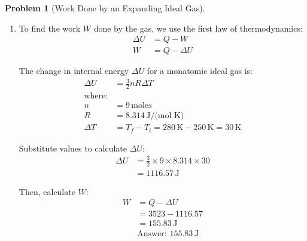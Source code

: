 \documentclass[12pt]{article}
\theoremstyle{definition} %
\newtheorem{problem}{Problem}
\theoremstyle{plain} %
\begin{document}
\begin{problem}[Work Done by an Expanding Ideal Gas]
    \noindent
    \begin{enumerate}
        \item 
        To find the work \( W \) done by the gas, we use the first law of thermodynamics:
        \begin{align*}
        \Delta U &= Q - W \\
        W &= Q - \Delta U
        \end{align*}
        
        The change in internal energy \( \Delta U \) for a monatomic ideal gas is:
        \begin{align*}
        \Delta U &= \frac{3}{2} n R \Delta T \\
        \text{where:} \\
        n &= 9 \, \text{moles} \\
        R &= 8.314 \, \text{J/(mol K)} \\
        \Delta T &= T_f - T_i = 280 \, \text{K} - 250 \, \text{K} = 30 \, \text{K}
        \end{align*}

        Substitute values to calculate \( \Delta U \):
        \begin{align*}
        \Delta U &= \frac{3}{2} \times 9 \times 8.314 \times 30 \\
        &= 1116.57 \, \text{J}
        \end{align*}

        Then, calculate \( W \):
        \begin{align*}
        W &= Q - \Delta U \\
        &= 3523 - 1116.57 \\
        &= 155.83 \, \text{J} \\
        &\text{Answer: } 155.83 \, \text{J}
        \end{align*}
    \end{enumerate}
\end{problem}
\end{document}

